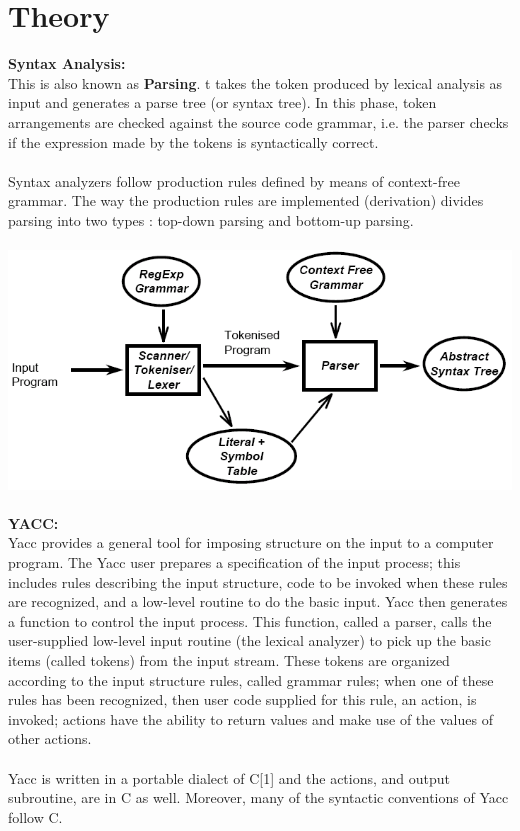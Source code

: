 \documentclass[10pt,a4paper]{article}
\begin{document}
\section{Theory}
\textbf{Syntax Analysis:}
\\This is also known as \textbf{Parsing}. t takes the token produced by lexical analysis as input and generates a parse tree (or syntax tree). In this phase, token arrangements are checked against the source code grammar, i.e. the parser checks if the expression made by the tokens is syntactically correct.
\\\\Syntax analyzers follow production rules defined by means of context-free grammar. The way the production rules are implemented (derivation) divides parsing into two types : top-down parsing and bottom-up parsing.
\\\\
\includegraphics[scale=0.5]{im1.png}
\\\\
\textbf{YACC:}
\\Yacc provides a general tool for imposing structure on the input to a computer program. The Yacc user prepares a specification of the input process; this includes rules describing the input structure, code to be invoked when these rules are recognized, and a low-level routine to do the basic input. Yacc then generates a function to control the input process. This function, called a parser, calls the user-supplied low-level input routine (the lexical analyzer) to pick up the basic items (called tokens) from the input stream. These tokens are organized according to the input structure rules, called grammar rules; when one of these rules has been recognized, then user code supplied for this rule, an action, is invoked; actions have the ability to return values and make use of the values of other actions. 
\\\\Yacc is written in a portable dialect of C[1] and the actions, and output subroutine, are in C as well. Moreover, many of the syntactic conventions of Yacc follow C. 
\end{document}
